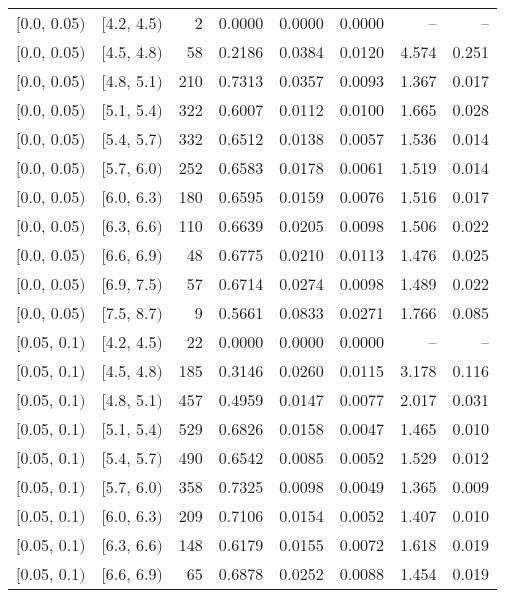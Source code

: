 \begin{longtable}{| l | l | r | r | r | r | r | r |}
        $[$0.0, 0.05$)$ & $[$4.2, 4.5$)$ & 2 & 0.0000 & 0.0000 & 0.0000 & -- & -- \\
        $[$0.0, 0.05$)$ & $[$4.5, 4.8$)$ & 58 & 0.2186 & 0.0384 & 0.0120 & 4.574 & 0.251 \\
        $[$0.0, 0.05$)$ & $[$4.8, 5.1$)$ & 210 & 0.7313 & 0.0357 & 0.0093 & 1.367 & 0.017 \\
        $[$0.0, 0.05$)$ & $[$5.1, 5.4$)$ & 322 & 0.6007 & 0.0112 & 0.0100 & 1.665 & 0.028 \\
        $[$0.0, 0.05$)$ & $[$5.4, 5.7$)$ & 332 & 0.6512 & 0.0138 & 0.0057 & 1.536 & 0.014 \\
        $[$0.0, 0.05$)$ & $[$5.7, 6.0$)$ & 252 & 0.6583 & 0.0178 & 0.0061 & 1.519 & 0.014 \\
        $[$0.0, 0.05$)$ & $[$6.0, 6.3$)$ & 180 & 0.6595 & 0.0159 & 0.0076 & 1.516 & 0.017 \\
        $[$0.0, 0.05$)$ & $[$6.3, 6.6$)$ & 110 & 0.6639 & 0.0205 & 0.0098 & 1.506 & 0.022 \\
        $[$0.0, 0.05$)$ & $[$6.6, 6.9$)$ & 48 & 0.6775 & 0.0210 & 0.0113 & 1.476 & 0.025 \\
        $[$0.0, 0.05$)$ & $[$6.9, 7.5$)$ & 57 & 0.6714 & 0.0274 & 0.0098 & 1.489 & 0.022 \\
        $[$0.0, 0.05$)$ & $[$7.5, 8.7$)$ & 9 & 0.5661 & 0.0833 & 0.0271 & 1.766 & 0.085 \\
        $[$0.05, 0.1$)$ & $[$4.2, 4.5$)$ & 22 & 0.0000 & 0.0000 & 0.0000 & -- & -- \\
        $[$0.05, 0.1$)$ & $[$4.5, 4.8$)$ & 185 & 0.3146 & 0.0260 & 0.0115 & 3.178 & 0.116 \\
        $[$0.05, 0.1$)$ & $[$4.8, 5.1$)$ & 457 & 0.4959 & 0.0147 & 0.0077 & 2.017 & 0.031 \\
        $[$0.05, 0.1$)$ & $[$5.1, 5.4$)$ & 529 & 0.6826 & 0.0158 & 0.0047 & 1.465 & 0.010 \\
        $[$0.05, 0.1$)$ & $[$5.4, 5.7$)$ & 490 & 0.6542 & 0.0085 & 0.0052 & 1.529 & 0.012 \\
        $[$0.05, 0.1$)$ & $[$5.7, 6.0$)$ & 358 & 0.7325 & 0.0098 & 0.0049 & 1.365 & 0.009 \\
        $[$0.05, 0.1$)$ & $[$6.0, 6.3$)$ & 209 & 0.7106 & 0.0154 & 0.0052 & 1.407 & 0.010 \\
        $[$0.05, 0.1$)$ & $[$6.3, 6.6$)$ & 148 & 0.6179 & 0.0155 & 0.0072 & 1.618 & 0.019 \\
        $[$0.05, 0.1$)$ & $[$6.6, 6.9$)$ & 65 & 0.6878 & 0.0252 & 0.0088 & 1.454 & 0.019 \\

\end{longtable}
